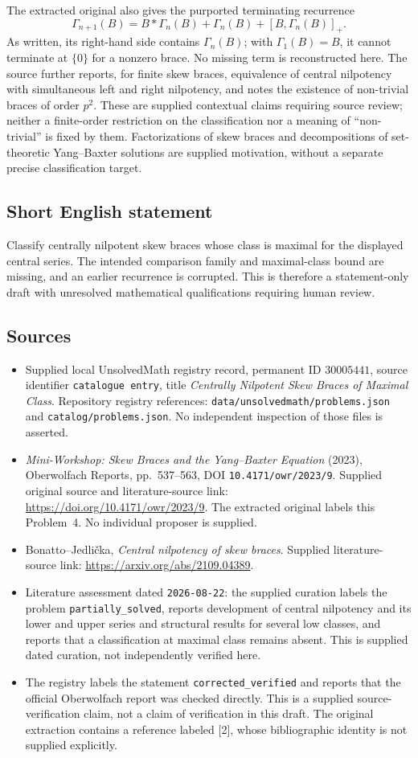 \documentclass[11pt]{article}
\begin{document}
The extracted original also gives the purported terminating recurrence
\[
\Gamma_{n+1}(B)=B*\Gamma_n(B)+\Gamma_n(B)+[B,\Gamma_n(B)]_+.
\]
As written, its right-hand side contains \(\Gamma_n(B)\); with \(\Gamma_1(B)=B\), it cannot terminate at \(\{0\}\) for a nonzero brace. No missing term is reconstructed here. The source further reports, for finite skew braces, equivalence of central nilpotency with simultaneous left and right nilpotency, and notes the existence of non-trivial braces of order \(p^2\). These are supplied contextual claims requiring source review; neither a finite-order restriction on the classification nor a meaning of ``non-trivial'' is fixed by them. Factorizations of skew braces and decompositions of set-theoretic Yang--Baxter solutions are supplied motivation, without a separate precise classification target.
\subsection{Short English statement}
Classify centrally nilpotent skew braces whose class is maximal for the displayed central series. The intended comparison family and maximal-class bound are missing, and an earlier recurrence is corrupted. This is therefore a statement-only draft with unresolved mathematical qualifications requiring human review.
\subsection{Sources}
\begin{itemize}
\item Supplied local UnsolvedMath registry record, permanent ID \(30005441\), source identifier \texttt{catalogue entry}, title \emph{Centrally Nilpotent Skew Braces of Maximal Class}. Repository registry references: \texttt{data/unsolvedmath/problems.json} and \texttt{catalog/problems.json}. No independent inspection of those files is asserted.
\item \emph{Mini-Workshop: Skew Braces and the Yang--Baxter Equation} (2023), Oberwolfach Reports, pp.~537--563, DOI \texttt{10.4171/owr/2023/9}. Supplied original source and literature-source link: \url{https://doi.org/10.4171/owr/2023/9}. The extracted original labels this Problem~4. No individual proposer is supplied.
\item Bonatto--Jedli\v{c}ka, \emph{Central nilpotency of skew braces}. Supplied literature-source link: \url{https://arxiv.org/abs/2109.04389}.
\item Literature assessment dated \texttt{2026-08-22}: the supplied curation labels the problem \texttt{partially\_solved}, reports development of central nilpotency and its lower and upper series and structural results for several low classes, and reports that a classification at maximal class remains absent. This is supplied dated curation, not independently verified here.
\item The registry labels the statement \texttt{corrected\_verified} and reports that the official Oberwolfach report was checked directly. This is a supplied source-verification claim, not a claim of verification in this draft. The original extraction contains a reference labeled [2], whose bibliographic identity is not supplied explicitly.
\end{itemize}
\end{document}
